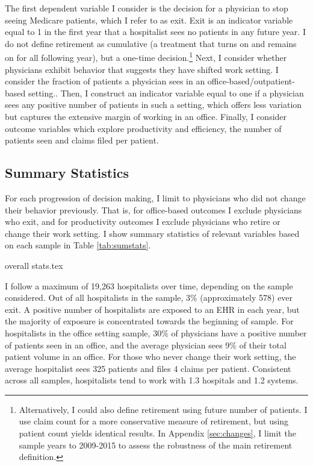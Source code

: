 \documentclass[12pt]{article}
\begin{document}
The first dependent variable I consider is the decision for a physician to stop seeing Medicare patients, which I refer to as exit. Exit is an indicator variable equal to 1 in the first year that a hospitalist sees no patients in any future year. I do not define retirement as cumulative (a treatment that turns on and remains on for all following year), but a one-time decision.\footnote{Alternatively, I could also define retirement using future number of patients. I use claim count for a more conservative measure of retirement, but using patient count yields identical results. In Appendix \ref{sec:changes}, I limit the sample years to 2009-2015 to assess the robustness of the main retirement definition.} Next, I consider whether physicians exhibit behavior that suggests they have shifted work setting. I consider the fraction of patients a physician sees in an office-based/outpatient-based setting.. Then, I construct an indicator variable equal to one if a physician sees any positive number of patients in such a setting, which offers less variation but captures the extensive margin of working in an office. Finally, I consider outcome variables which explore productivity and efficiency, the number of patients seen and claims filed per patient.


\subsection{Summary Statistics}

For each progression of decision making, I limit to physicians who did not change their behavior previously. That is, for office-based outcomes I exclude physicians who exit, and for productivity outcomes I exclude physicians who retire or change their work setting. I show summary statistics of relevant variables based on each sample in Table \ref{tab:sumstats}. 

{overall stats.tex}

\normalsize
I follow a maximum of 19,263 hospitalists over time, depending on the sample considered. Out of all hospitalists in the sample, 3\% (approximately 578) ever exit. A positive number of hospitalists are exposed to an EHR in each year, but the majority of exposure is concentrated towards the beginning of sample. For hospitalists in the office setting sample, 30\% of physicians have a positive number of patients seen in an office, and the average physician sees 9\% of their total patient volume in an office. For those who never change their work setting, the average hospitalist sees 325 patients and files 4 claims per patient. Consistent across all samples, hospitalists tend to work with 1.3 hospitals and 1.2 systems. 
\end{document}
